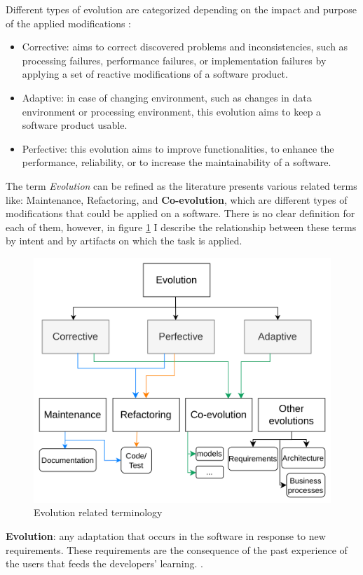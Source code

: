 Different types of evolution are categorized depending on the impact and purpose of the applied modifications \cite{lientz1980software,Swanson1976}:
\begin{itemize}
	
	\item  Corrective: aims to correct discovered problems and inconsistencies, such as processing failures, performance failures, or implementation failures by applying a set of reactive modifications of a software product.  
	
	\item  Adaptive: in case of changing environment, such as changes in data environment or processing environment, this evolution aims to keep a software product usable.
	
	\item Perfective: this evolution aims to improve functionalities, to enhance the performance, reliability, or to increase the maintainability of a software.  
	
\end{itemize}
The term \textit{Evolution} can be refined as the literature presents various related terms like: Maintenance, Refactoring, and \textbf{Co-evolution}, which are different types of modifications that could be applied on a software. There is no clear definition for each of them, however, in figure \ref{fig:evolutiontypes} I describe the relationship between these terms by intent and by artifacts on which the task is applied.


\begin{figure}[t]
	\begin{center}
		\includegraphics[width=0.6\linewidth]{./pics/soaPics/evolutiontypes.png}
	\end{center}
	\caption{Evolution related terminology}
	\label{fig:evolutiontypes}
\end{figure}
\textbf{Evolution}: any adaptation that occurs in the software in response to new requirements. These requirements are the consequence of the past experience of the users that feeds the developers' learning. \cite{bennett2000software}. 

